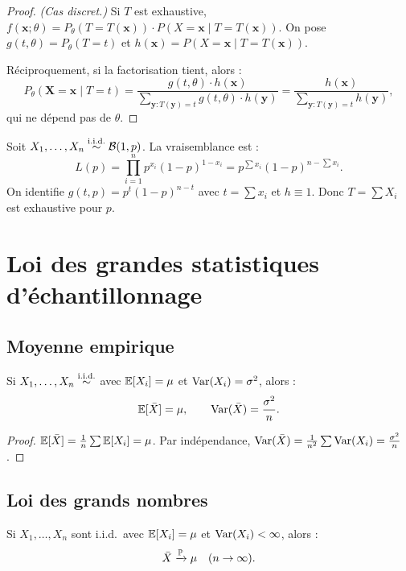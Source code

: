 \begin{proof}
\textit{(Cas discret.)} Si $T$ est exhaustive, $f(\mathbf{x};\theta) = P_\theta(T=T(\mathbf{x}))\cdot P(X=\mathbf{x}\mid T=T(\mathbf{x}))$. On pose $g(t,\theta)=P_\theta(T=t)$ et $h(\mathbf{x})=P(X=\mathbf{x}\mid T=T(\mathbf{x}))$.

R\'eciproquement, si la factorisation tient, alors :
\[
P_\theta(\mathbf{X}=\mathbf{x}\mid T=t) = \frac{g(t,\theta)\cdot h(\mathbf{x})}{\sum_{\mathbf{y}:T(\mathbf{y})=t} g(t,\theta)\cdot h(\mathbf{y})} = \frac{h(\mathbf{x})}{\sum_{\mathbf{y}:T(\mathbf{y})=t} h(\mathbf{y})},
\]
qui ne d\'epend pas de $\theta$.
\end{proof}

\begin{exemple}
Soit $X_1,\ldots,X_n\overset{\text{i.i.d.}}{\sim}\mathcal{B}(1,p)$. La vraisemblance est :
\[
L(p) = \prod_{i=1}^n p^{x_i}(1-p)^{1-x_i} = p^{\sum x_i}(1-p)^{n-\sum x_i}.
\]
On identifie $g(t,p)=p^t(1-p)^{n-t}$ avec $t=\sum x_i$ et $h\equiv 1$. Donc $T=\sum X_i$ est exhaustive pour $p$.
\end{exemple}

\section{Loi des grandes statistiques d'\'echantillonnage}

\subsection{Moyenne empirique}

\begin{theoreme}
Si $X_1,\ldots,X_n \overset{\text{i.i.d.}}{\sim}$ avec $\mathbb{E}[X_i]=\mu$ et $\operatorname{Var}(X_i)=\sigma^2$, alors :
\[
\mathbb{E}[\bar{X}] = \mu, \qquad \operatorname{Var}(\bar{X}) = \frac{\sigma^2}{n}.
\]
\end{theoreme}

\begin{proof}
$\mathbb{E}[\bar{X}]=\frac{1}{n}\sum\mathbb{E}[X_i]=\mu$. Par ind\'ependance, $\operatorname{Var}(\bar{X})=\frac{1}{n^2}\sum\operatorname{Var}(X_i)=\frac{\sigma^2}{n}$.
\end{proof}

\subsection{Loi des grands nombres}

\begin{theoreme}
Si $X_1,\ldots,X_n$ sont i.i.d.\ avec $\mathbb{E}[X_i]=\mu$ et $\operatorname{Var}(X_i)<\infty$, alors :
\[
\bar{X} \xrightarrow{\mathbb{P}} \mu \quad (n\to\infty).
\]
\end{theoreme}

